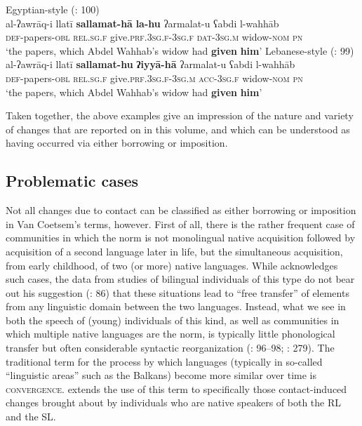 \documentclass[output=paper]{langsci/langscibook}
\begin{document}
\ea
\label{introwilmsen1}Egyptian-style  (\citealt{Wilmsen2010}: 100)\\
\gll al-ʔawrāq-i llatī \textbf{sallamat-hā} \textbf{la-hu} ʔarmalat-u ʕabdi l-wahhāb\\
     \textsc{def}{}-papers-\textsc{obl} \textsc{rel.sg.f} give.\textsc{prf.3sg.f-3sg.f} \textsc{dat-3sg.m} widow-\textsc{nom} \textsc{pn}\\
     \glt ‘the papers, which Abdel Wahhab’s widow had \textbf{given} \textbf{him}’
\ex \label{introwilmsen2}Lebanese-style  (\citealt{Wilmsen2010}: 99)\\
\gll al-ʔawrāq-i llatī \textbf{sallamat-hu} \textbf{ʔiyyā-hā} ʔarmalat-u ʕabdi l-wahhāb\\
     \textsc{def}{}-papers-\textsc{obl} \textsc{rel.sg.f} give.\textsc{prf.3sg.f-3sg.m} \textsc{acc-3sg.f} widow-\textsc{nom} \textsc{pn}\\
\glt ‘the papers, which Abdel Wahhab’s widow had \textbf{given} \textbf{him}’\z

Taken together, the above examples give an impression of the nature and variety of changes that are reported on in this volume, and which can be understood as having occurred via either borrowing or {imposition}.

\subsection{Problematic cases}\label{introproblem}

Not all changes due to contact can be classified as either borrowing or {imposition} in Van Coetsem's terms, however. First of all, there is the rather frequent case of communities in which the norm is not {monolingual} native acquisition followed by acquisition of a second language later in life, but the simultaneous acquisition, from early childhood, of two (or more) native languages. While \citet{VanCoetsem2000} acknowledges such cases, the data from studies of bilingual individuals of this type do not bear out his suggestion (\citeyear{VanCoetsem2000}: 86) that these situations lead to ``free {transfer}'' of elements from any linguistic domain between the two languages. Instead, what we see in both the speech of (young) individuals of this kind, as well as communities in which multiple native languages are the norm, is typically little phonological {transfer} but often considerable syntactic reorganization (\citealt{Lucas2009}: 96--98; \citeyear{Lucas2012}: 279). The traditional term for the process by which languages (typically in so-called ``linguistic areas'' such as the Balkans) become more similar over time is \textsc{convergence}. \citet{Lucas2015} extends the use of this term to specifically those contact-induced changes brought about by individuals who are native speakers of both the RL and the SL.
\end{document}
